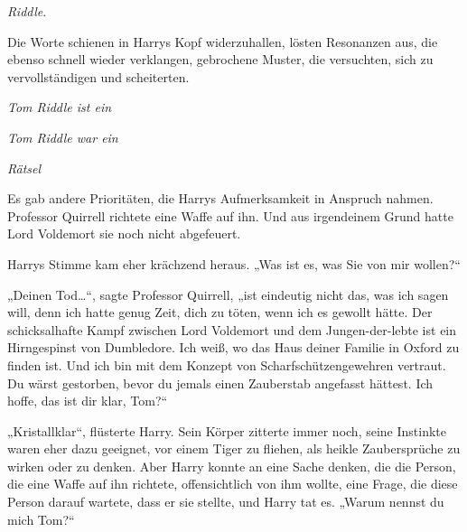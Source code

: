 
 \emph{Riddle}.

\hplettrineextrapara
Die Worte schienen in Harrys Kopf widerzuhallen, lösten Resonanzen aus, die ebenso schnell wieder verklangen, gebrochene Muster, die versuchten, sich zu vervollständigen und scheiterten.

\emph{Tom Riddle ist ein}

\emph{Tom Riddle war ein}

\emph{Rätsel}

Es gab andere Prioritäten, die Harrys Aufmerksamkeit in Anspruch nahmen.
Professor Quirrell richtete eine Waffe auf ihn.
Und aus irgendeinem Grund hatte Lord Voldemort sie noch nicht abgefeuert.

Harrys Stimme kam eher krächzend heraus.
„Was ist es, was Sie von mir wollen?“

„Deinen Tod…“, sagte Professor Quirrell, „ist eindeutig nicht das, was ich sagen will, denn ich hatte genug Zeit, dich zu töten, wenn ich es gewollt hätte. Der schicksalhafte Kampf zwischen Lord Voldemort und dem Jungen-der-lebte ist ein Hirngespinst von Dumbledore. Ich weiß, wo das Haus deiner Familie in Oxford zu finden ist. Und ich bin mit dem Konzept von Scharfschützengewehren vertraut. Du wärst gestorben, bevor du jemals einen Zauberstab angefasst hättest. Ich hoffe, das ist dir klar, Tom?“

„Kristallklar“, flüsterte Harry.
Sein Körper zitterte immer noch, seine Instinkte waren eher dazu geeignet, vor einem Tiger zu fliehen, als heikle Zaubersprüche zu wirken oder zu denken. Aber Harry konnte an eine Sache denken, die die Person, die eine Waffe auf ihn richtete, offensichtlich von ihm wollte, eine Frage, die diese Person darauf wartete, dass er sie stellte, und Harry tat es.
„Warum nennst du mich Tom?“

